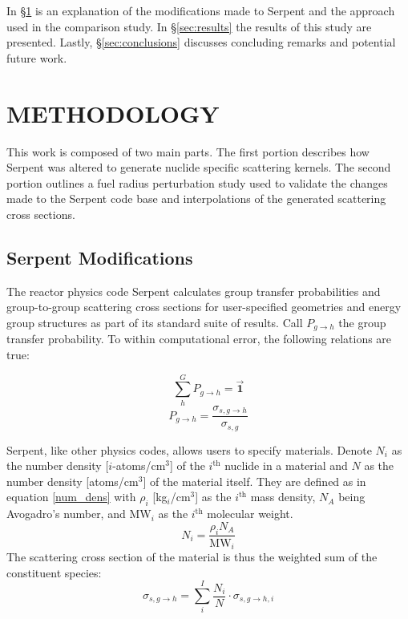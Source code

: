 \documentclass{physor2012}
\newcommand{\superscript}[1]{\ensuremath{^{\textrm{#1}}}}
\begin{document}
In \S \ref{sec:methodology} is an explanation of the modifications made to Serpent
and the approach used in the comparison study.  In \S \ref{sec:results} the
results of this study are presented.  Lastly, \S \ref{sec:conclusions}
discusses concluding remarks and potential future work.

\section{METHODOLOGY}
\label{sec:methodology}

This work is composed of two main parts.  The first portion describes how
Serpent was altered to generate nuclide specific scattering kernels.
The second portion outlines a fuel radius perturbation study used to
validate the changes made to the Serpent code base and interpolations of the
generated scattering cross sections.

\subsection{Serpent Modifications}

The reactor physics code Serpent calculates group transfer probabilities and
group-to-group scattering cross sections for user-specified geometries and energy
group structures as part of its standard suite of results.   Call $P_{g\to h}$
the group transfer probability.  To within computational error, the following
relations are true:

\begin{equation}\label{P_h_norm}\sum_h^G P_{g\to h} = \mathbf{\vec{1}}\end{equation}
\begin{equation}\label{P_sig_norm}P_{g\to h} = \frac{\sigma_{s,g\to h}}{\sigma_{s,g}}\end{equation}

Serpent, like other physics codes, allows users to specify materials.
Denote $N_i$ as the number density [$i$-atoms/cm\superscript{3}] of the $i$\superscript{th} 
nuclide in a material and $N$ as the number density [atoms/cm\superscript{3}] of the material 
itself.  They are defined as in equation \ref{num_dens} with
$\rho_i$ [kg$_i$/cm\superscript{3}] as the $i$\superscript{th} mass density, $N_A$ 
being Avogadro's number, and MW$_i$ as the $i$\superscript{th} molecular weight.
\begin{equation}
\label{num_dens}
N_i = \frac{\rho_i N_A}{\mbox{MW}_i} 
\end{equation}
The scattering cross section of the material is thus the weighted sum of the 
constituent species:
\begin{equation}
\label{mat_norm}
\sigma_{s,g\to h} = \sum_i^I \frac{N_i}{N} \cdot \sigma_{s,g\to h,i}
\end{equation}
\end{document}
